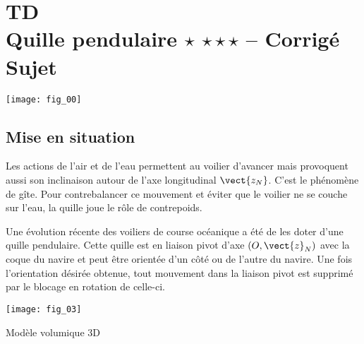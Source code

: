 \chapter*{TD  \\ 
Quille pendulaire \ifnormal $\star$ \else \fi \iftdifficile $\star\star\star$ \else \fi -- 
\ifprof Corrigé \else Sujet \fi}

\iflivret {} \else
\ifprof  {} \else \fi
\fi

\setcounter{question}{0}
%

\begin{marginfigure} [4cm]
\centering
\texttt{[image: fig\_00]}
\end{marginfigure}


\section*{Mise en situation}
\ifprof
\else

Les actions de l'air et de l'eau permettent au voilier d'avancer mais provoquent aussi son inclinaison autour de l'axe longitudinal $\vect{z_N}$. C’est le phénomène de gîte. Pour contrebalancer ce mouvement et éviter que le voilier ne se couche sur l’eau, la quille joue le rôle de contrepoids. 


Une évolution récente des voiliers de course océanique a été de les doter d’une quille pendulaire. Cette quille est en liaison pivot d’axe $\left(O,\vect{z}_N \right)$ avec la coque du navire et peut être orientée d’un côté ou de l’autre du navire. Une fois l’orientation désirée obtenue, tout mouvement dans la liaison pivot est supprimé par le blocage en rotation de celle-ci. 

\begin{marginfigure}
\texttt{[image: fig\_03]}

\caption{Modèle volumique 3D}
\end{marginfigure}

